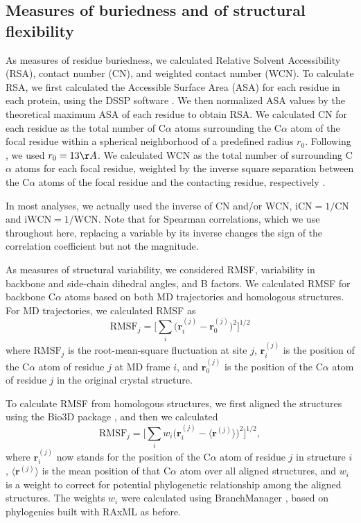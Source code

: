 \documentclass[12pt]{article}
\begin{document}
\subsection*{Measures of buriedness and of structural flexibility}

As measures of residue buriedness, we calculated Relative Solvent Accessibility (RSA), contact number (CN), and weighted contact number (WCN). To calculate RSA, we first calculated the Accessible Surface Area (ASA) for each residue in each protein, using the DSSP software \citep{KabschSander1983}. We then normalized ASA values by the theoretical maximum ASA of each residue \citep{Tienetal2013} to obtain RSA. We calculated CN for each residue as the total number of C$\alpha$ atoms surrounding the  C$\alpha$ atom of the focal residue within a spherical neighborhood of a predefined radius $r_0$. Following \citet{Yehetal2014}, we used $r_0=13\AA$. We calculated WCN as the total number of surrounding C$\alpha$ atoms for each focal residue, weighted by the inverse square separation between the C$\alpha$ atoms of the focal residue and the contacting residue, respectively \citep{Shihetal2012}.

In most analyses, we actually used the inverse of CN and/or WCN, $\text{iCN}=1/\text{CN}$ and $\text{iWCN}=1/\text{WCN}$. Note that for Spearman correlations, which we use throughout here, replacing a variable by its inverse changes the sign of the correlation coefficient but not the magnitude.

As measures of structural variability, we considered RMSF, variability in backbone and side-chain dihedral angles, and B factors. We calculated RMSF for backbone C$\alpha$ atoms based on both MD trajectories and homologous structures. For MD trajectories, we calculated RMSF as
\begin{equation}
    \text{RMSF}_j = \Big[\sum_i \big(\mathbf{r}_i^{(j)}-\mathbf{r}_0^{(j)}\big)^2\Big]^{1/2}
\end{equation}
where $\text{RMSF}_j$ is the root-mean-square fluctuation at site $j$, $\mathbf{r}_i^{(j)}$ is the position of the C$\alpha$ atom of residue $j$ at MD frame $i$, and $\mathbf{r}_0^{(j)}$ is the position of the C$\alpha$ atom of residue $j$ in the original crystal structure.

To calculate RMSF from homologous structures, we first aligned the structures using the Bio3D package \citep{Grantetal2006}, and then we calculated
\begin{equation}
    \text{RMSF}_j = \Big[\sum_i w_i\big(\mathbf{r}_i^{(j)}-\langle\mathbf{r}^{(j)}\rangle\big)^2\Big]^{1/2},
\end{equation}
where $\mathbf{r}_i^{(j)}$ now stands for the position of the C$\alpha$ atom of residue $j$ in structure $i$, $\langle\mathbf{r}^{(j)}\rangle$ is the mean position of that C$\alpha$ atom over all aligned structures, and $w_i$ is a weight to correct for potential phylogenetic relationship among the aligned structures. The weights $w_i$ were calculated using BranchManager \citep{StoneSidow2007}, based on phylogenies built with RAxML as before.
\end{document}
